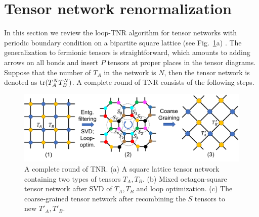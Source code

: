 \documentclass[11pt]{article}
\begin{document}
\section{Tensor network renormalization}\label{sec:tnr-review}

In this section we review the loop-TNR algorithm for tensor networks with periodic boundary condition on a bipartite square lattice (see Fig.~\ref{fig:tnr}a) \cite{Yang2017}. 
The generalization to fermionic tensors is straightforward, which amounts to adding arrows on all bonds and insert $P$ tensors at proper places in the tensor diagrams. 
Suppose that the number of \(T_A\) in the network is \(N\), then the tensor network is denoted as \(\operatorname{tr}(T_A^N T_B^N)\). A complete round of TNR consists of the following steps.

\begin{figure}[h]
    \centering
    \includegraphics[scale=0.5]{coarsegrain.pdf}
    \caption{A complete round of TNR. (a) A square lattice tensor network containing two types of tensors \(T_A, T_B\). (b) Mixed octagon-square tensor network after SVD of \(T_A, T_B\) and loop optimization. (c) The coarse-grained tensor network after recombining the \(S\) tensors to new \(T'_A, T'_B\). }
    \label{fig:tnr}
\end{figure}
\end{document}
